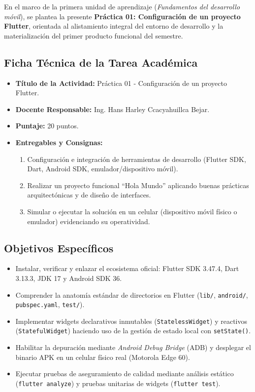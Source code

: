 \documentclass[12pt,a4paper]{article}
\begin{document}
En el marco de la primera unidad de aprendizaje (\textit{Fundamentos del desarrollo móvil}), se plantea la presente \textbf{Práctica 01: Configuración de un proyecto Flutter}, orientada al alistamiento integral del entorno de desarrollo y la materialización del primer producto funcional del semestre.

\subsection{Ficha Técnica de la Tarea Académica}
\begin{itemize}[leftmargin=*]
    \item \textbf{Título de la Actividad:} Práctica 01 - Configuración de un proyecto Flutter.
    \item \textbf{Docente Responsable:} Ing. Hans Harley Ccacyahuillca Bejar.
    \item \textbf{Puntaje:} 20 puntos.
    \item \textbf{Entregables y Consignas:}
    \begin{enumerate}
        \item Configuración e integración de herramientas de desarrollo (Flutter SDK, Dart, Android SDK, emulador/dispositivo móvil).
        \item Realizar un proyecto funcional ``Hola Mundo'' aplicando buenas prácticas arquitectónicas y de diseño de interfaces.
        \item Simular o ejecutar la solución en un celular (dispositivo móvil físico o emulador) evidenciando su operatividad.
    \end{enumerate}
\end{itemize}

\subsection{Objetivos Específicos}
\begin{itemize}[leftmargin=*]
    \item Instalar, verificar y enlazar el ecosistema oficial: Flutter SDK 3.47.4, Dart 3.13.3, JDK 17 y Android SDK 36.
    \item Comprender la anatomía estándar de directorios en Flutter (\texttt{lib/}, \texttt{android/}, \texttt{pubspec.yaml}, \texttt{test/}).
    \item Implementar widgets declarativos inmutables (\texttt{StatelessWidget}) y reactivos (\texttt{StatefulWidget}) haciendo uso de la gestión de estado local con \texttt{setState()}.
    \item Habilitar la depuración mediante \textit{Android Debug Bridge} (ADB) y desplegar el binario APK en un celular físico real (Motorola Edge 60).
    \item Ejecutar pruebas de aseguramiento de calidad mediante análisis estático (\texttt{flutter analyze}) y pruebas unitarias de widgets (\texttt{flutter test}).
\end{itemize}
\end{document}
